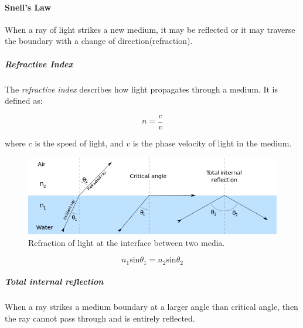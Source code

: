 \paragraph{Snell's Law} When a ray of light strikes a new medium, it may be reflected or it may traverse the boundary with a change of direction(refraction).

\subparagraph{Refractive Index} The \emph{refractive index} describes how light propagates through a medium. It is defined as:

$$n=\frac{c}{v}$$

where $c$ is the speed of light, and $v$ is the phase velocity of light in the medium.

\begin{figure}
  \centering
  \includegraphics[width=4.5in]{fig/650px-RefractionReflextion.svg.png}
  \caption{Refraction of light at the interface between two media.}\label{fig_snell}
\end{figure}

$$n_1\textrm{sin}\theta _1 = n_2 \textrm{sin}\theta _2$$

\subparagraph{Total internal reflection} When a ray strikes a medium boundary at a larger angle than critical angle, then the ray cannot pass through and is entirely reflected.

